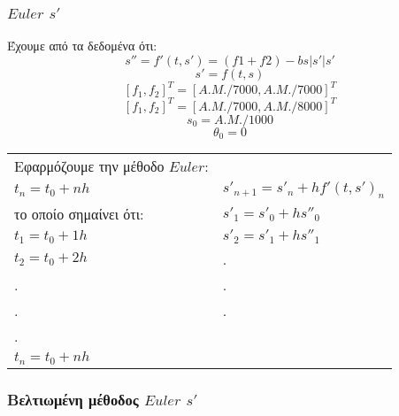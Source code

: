 \documentclass[a4paper]{article}
\begin{document}
        
        \subsubsection*{$Euler$ $s'$}
        Έχουμε από τα δεδομένα ότι:
        \begin{equation}
            s''=f'(t,s')=(f1+f2)-bs|s'|s'
        \end{equation}
        \begin{equation}
            s'=f(t,s)
        \end{equation}
        \[{[f_1,f_2]}^T={[A.M./7000, A.M./7000]}^T\]
        \[{[f_1,f_2]}^T={[A.M./7000, A.M./8000]}^T\]
        \[s_0=A.M./1000\]
        \[\theta_0=0\]

        
            \begin{tabular}{ll}
                Εφαρμόζουμε την μέθοδο $Euler$:                             &                               \\
                $t_n=t_0+nh$                                                & $s'_{n+1}=s'_n+hf'(t,s')_n$   \\
                το οποίο σημαίνει ότι:                                      & $s'_1=s'_0+hs''_0$            \\
                $t_1=t_0+1h$                                                & $s'_2=s'_1+hs''_1$            \\
                $t_2=t_0+2h$                                                & .                             \\
                .                                                           & .                             \\
                .                                                           & .                             \\
                .                                                           &                               \\
                $t_n=t_0+nh$                                                &                         
            \end{tabular}





        \subsubsection*{Bελτιωμένη μέθοδος $Euler$ $s'$}
\end{document}
